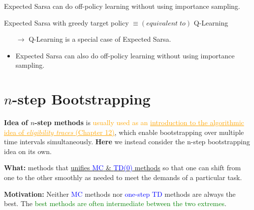 \documentclass[12pt, a4paper]{article}
\let\stdsection\section
\renewcommand\section{\newpage\stdsection} %
\begin{document}
Expected Sarsa can do off-policy learning without using importance sampling.

Expected Sarsa with greedy target policy $\equiv (equivalent\;to)$ Q-Learning
\begin{itemize}
  \item[$\rightarrow$] Q-Learning is a special case of Expected Sarsa.
  \item Expected Sarsa can also do off-policy learning without using importance sampling.
\end{itemize}


















\section{$n$-step Bootstrapping}\label{nstep-bootstrapping}

\begin{tcolorbox}[colback=yellow!5,colframe=yellow!75!black,title=NOTE]
  \textbf{Idea of $n$-step methods} is \textcolor{Orange}{usually used as an \uline{introduction to the algorithmic idea of \textit{eligibility traces} (Chapter 12)}}, which enable bootstrapping over multiple time intervals simultaneously. \textbf{Here} we instead consider the n-step bootstrapping idea on its own.
\end{tcolorbox}


\textbf{What:} methods that \uline{unifies \textcolor{blue}{MC} \& \textcolor{blue}{TD(0)} methods} so that one can shift from one to the other smoothly as needed to meet the demands of a particular task.

\textbf{Motivation:} Neither \textcolor{blue}{MC} methods nor \textcolor{blue}{one-step TD} methods are always the best. The \textcolor{Green}{best methods are often intermediate between the two extremes}.
\end{document}
